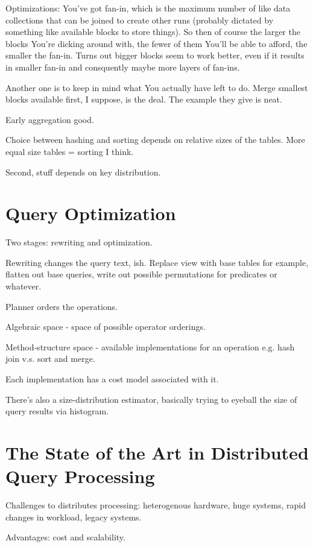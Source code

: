 \documentclass{article}
\begin{document}
	Optimizations: You've got fan-in, which is the maximum number of like data collections that can be joined to create other runs (probably dictated by something like available blocks to store things). So then of course the larger the blocks You're dicking around with, the fewer of them You'll be able to afford, the smaller the fan-in. Turns out bigger blocks seem to work better, even if it results in smaller fan-in and consquently maybe more layers of fan-ins.
		
	Another one is to keep in mind what You actually have left to do. Merge smallest blocks available first, I suppose, is the deal. The example they give is neat.
	
	Early aggregation good.
	
	Choice between hashing and sorting depends on relative sizes of the tables. More equal size tables = sorting I think.
	
	Second, stuff depends on key distribution.
		
\newpage
\section{Query Optimization}	

	Two stages: rewriting and optimization.
	
	Rewriting changes the query text, ish. Replace view with base tables for example, flatten out base queries, write out possible permutations for predicates or whatever.
	
	Planner orders the operations.
	
	Algebraic space - space of possible operator orderings.
	
	Method-structure space - available implementations for an operation e.g. hash join v.s. sort and merge.
	
	Each implementation has a cost model associated with it.
	
	There's also a size-distribution estimator, basically trying to eyeball the size of query results via histogram.
		
\newpage
\section{The State of the Art in Distributed Query Processing}

	Challenges to distributes processing: heterogenous hardware, huge systems, rapid changes in workload, legacy systems.
	
	Advantages: cost and scalability.
	
\end{document}
